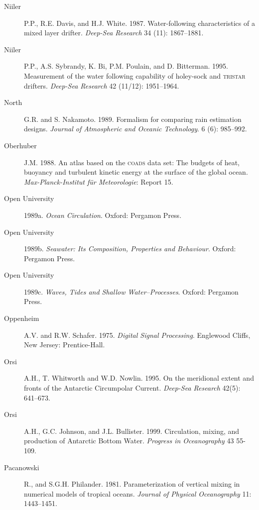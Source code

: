 \begin{description}
\item [Niiler]P.P., R.E. Davis, and H.J. White. 1987. Water-following
  characteristics of a mix\-ed layer drifter. \textit{Deep-Sea
    Research} 34 (11): 1867--1881.

\item [Niiler]P.P., A.S. Sybrandy, K. Bi, P.M. Poulain, and
  D. Bitterman. 1995.  Measurement of the water following capability
  of holey-sock and \textsc{tristar} drifters. \textit{Deep-Sea
    Research} 42 (11/12): 1951--1964.

\item [North]G.R. and S. Nakamoto. 1989. Formalism for comparing rain
  estimation designs. \textit{Journal of Atmospheric and Oceanic
    Technology}. 6 (6): 985--992.

\item [Oberhuber]J.M. 1988. An atlas based on the \textsc{coads} data
  set: The budgets of heat, buoyancy and turbulent kinetic energy at
  the surface of the global ocean. \textit{Max-Planck-Institut f\"{u}r
    Meteorologie}: Report 15.

\item [Open University]1989a. \textit{Ocean Circulation}.  Oxford:
  Pergamon Press.

\item[Open University]1989b. \textit{Seawater: Its Composition,
  Properties and Behaviour}.  Oxford: Pergamon Press.

\item [Open University]1989c. \textit{Waves, Tides and Shallow
  Water--Processes}.  Oxford: Pergamon Press.

\item [Oppenheim]A.V. and R.W. Schafer. 1975. \textit{Digital Signal
  Processing}.  Englewood Cliffs, New Jersey: Prentice-Hall.

\item [Orsi]A.H., T. Whitworth and W.D. Nowlin. 1995. On the
  meridional extent and fronts of the Antarctic Circumpolar
  Current. \textit{Deep-Sea Research} 42(5): 641--673.

\item [Orsi]A.H., G.C. Johnson, and J.L. Bullister. 1999. Circulation,
  mixing, and production of Antarctic Bottom Water.  \textit{Progress
    in Oceanography} 43 55-109.

\item [Pacanowski]R., and S.G.H. Philander. 1981. Parameterization of
  vertical mixing in numerical models of tropical
  oceans. \textit{Journal of Physical Oceanography} 11: 1443--1451.


\end{description}
